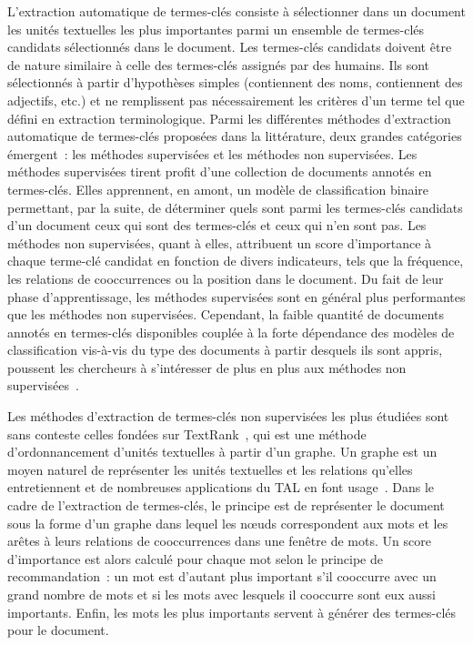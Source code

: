   L'extraction automatique de termes-clés consiste à sélectionner dans un
  document les unités textuelles les plus importantes parmi un ensemble de
  termes-clés candidats sélectionnés dans le document. Les termes-clés candidats
  doivent être de nature similaire à celle des termes-clés assignés par des
  humains. Ils sont sélectionnés à partir d'hypothèses simples (contiennent des
  noms, contiennent des adjectifs, etc.) et ne remplissent pas nécessairement
  les critères d'un terme tel que défini en extraction terminologique. Parmi les
  différentes méthodes d'extraction automatique de termes-clés proposées dans la
  littérature, deux grandes catégories émergent~: les méthodes supervisées et
  les méthodes non supervisées. Les méthodes supervisées tirent profit d'une collection de
  documents annotés en termes-clés. Elles apprennent, en amont, un modèle de
  classification binaire permettant, par la suite, de déterminer quels sont
  parmi les termes-clés candidats d'un document ceux qui sont des termes-clés et
  ceux qui n'en sont pas. Les méthodes non supervisées, quant à elles,
  attribuent un score d'importance à chaque terme-clé candidat en
  fonction de divers indicateurs, tels que la fréquence, les relations de
  cooccurrences ou la position dans le document. Du fait de leur phase
  d'apprentissage, les méthodes supervisées sont en général plus performantes
  que les méthodes non supervisées. Cependant, la faible quantité de documents
  annotés en termes-clés disponibles couplée à la forte dépendance des modèles
  de classification vis-à-vis du type des documents à partir desquels ils sont
  appris, poussent les chercheurs à s'intéresser de plus en plus aux méthodes
  non supervisées~\cite{hassan2010conundrums}.

  Les méthodes d'extraction de termes-clés non supervisées les plus étudiées
  sont sans conteste celles fondées sur TextRank~\cite{mihalcea2004textrank}, qui
  est une méthode d'ordonnancement d'unités textuelles à partir d'un graphe. Un
  graphe est un moyen naturel de représenter les unités textuelles et les
  relations qu'elles entretiennent et de nombreuses applications du TAL en font
  usage~\cite{kozareva2013textgraphs}. Dans le cadre de l'extraction de
  termes-clés, le principe est de représenter le document sous la forme d'un
  graphe dans lequel les n\oe{}uds correspondent aux mots et les arêtes
  à leurs relations de cooccurrences dans une fenêtre de mots. Un
  score d'importance est alors calculé pour chaque mot selon le principe de
  recommandation~: un mot est d'autant plus important s'il cooccurre avec un
  grand nombre de mots et si les mots avec lesquels il cooccurre sont eux aussi
  importants. Enfin, les mots les plus importants servent à générer des
  termes-clés pour le document.

